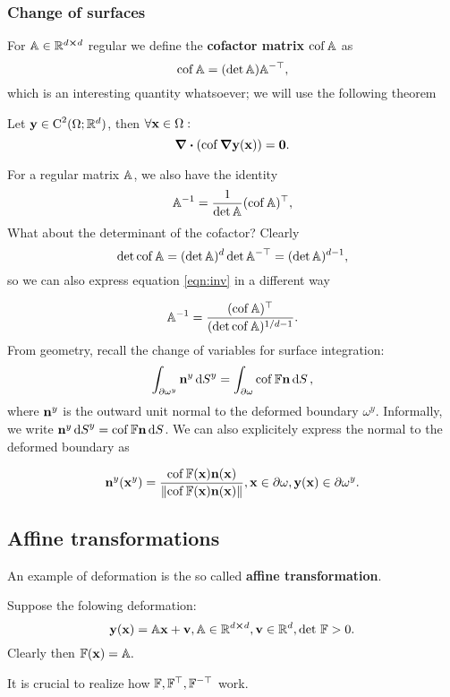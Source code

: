 \documentclass[reqno, a4paper]{article}
\begin{document}
\subsubsection{Change of surfaces}
\label{sec:chsurfaces}
For $\mathbb{A} \in {\mathbb R}^{d \cross d}$ regular we define the \textbf{cofactor matrix} $\operatorname{cof} \mathbb{A}$ as
\[
	\operatorname{cof} \mathbb{A} = (\det \mathbb{A}) \mathbb{A}^{-\top},
\]
which is an interesting quantity whatsoever; we will use the following theorem

\begin{theorem}
	Let $\vb{y} \in \text{C}^2(\Omega;{\mathbb R}^d)$, then $\forall \vb{x}\in \Omega:$
	\[
		\divergence({\cof \grad{\vb{y}(\vb{x})}}) = \vb{0}.
	\]
\end{theorem}
For a regular matrix $\mathbb{A}$, we also have the identity
\begin{equation}
	\label{eqn:inv}
	\mathbb{A}^{-1} = \frac{1}{\det \mathbb{A}} (\operatorname{cof} \mathbb{A})^\top,
\end{equation}
What about the determinant of the cofactor? Clearly
\[
	\det \operatorname{cof} \mathbb{A} = (\det \mathbb{A})^d \det \mathbb{A}^{-\top} = (\det \mathbb{A})^{d-1},
\]
so we can also express equation \ref{eqn:inv} in a different way

\begin{equation}
    \label{eqn:invbetter}
    \mathbb{A}^{-1} = \frac{(\operatorname{cof} \mathbb{A})^\top}{(\det \operatorname{cof} \mathbb{A})^{1/d-1}}.
\end{equation}
From geometry, recall the change of variables for surface integration:
\[
	\int_{\partial \omega^y}\vb{n}^y \dd{S}^y = \int_{\partial \omega}\operatorname{cof} \mathbb{F}\vb{n} \dd{S},
\]
where $\vb{n}^y$ is the outward unit normal to the deformed boundary $\omega^y$. Informally, we write $\vb{n}^y \dd{S}^y = \operatorname{cof} \mathbb{F} \vb{n} \dd{S}$. We can also explicitely express the normal to the deformed boundary as

\begin{equation}
    \label{eqn:deformed_normal}
    \vb{n}^y(\vb{x}^y)=\frac{\operatorname{cof} \mathbb{F} (\vb{x}) \vb{n}(\vb{x})}{\norm{\operatorname{cof} \mathbb{F}(\vb{x}) \vb{n}(\vb{x})}}, \vb{x} \in \partial \omega, \vb{y}(\vb{x}) \in \partial \omega^y.
\end{equation}

\subsection{Affine transformations}
\label{sec:affine_transf}
An example of deformation is the so called \textbf{affine transformation}.
\begin{example}
	Suppose the folowing deformation:
	\[
		\vb{y}(\vb{x}) = \mathbb{A} \vb{x} + \vb{v}, \mathbb{A}\in {\mathbb R}^{d \cross d}, \vb{v} \in {\mathbb R}^d, \det\, \mathbb{F} > 0.
	\]
	Clearly then $\mathbb{F}(\vb{x}) = \mathbb{A}.$
\end{example}
It is crucial to realize how $\mathbb{F}, \mathbb{F}^\top, \mathbb{F}^{-\top}$ work.
\end{document}
